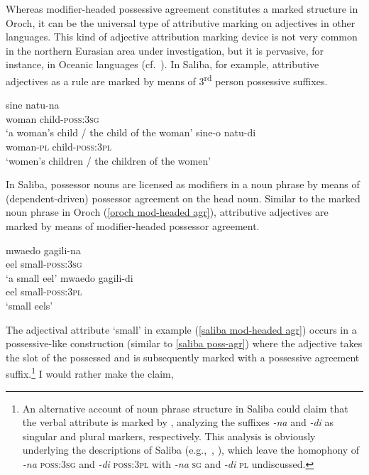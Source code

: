 Whereas modifier\hyp{}headed possessive agreement constitutes a marked structure in Oroch, it can be the universal type of attributive marking on adjectives in other languages. This kind of adjective attribution marking device is not very common in the northern Eurasian area under investigation, but it is pervasive, for instance, in Oceanic languages (cf.~\citealt{ross1998}). In Saliba, for example, attributive adjectives as a rule are marked by means of 3\textsuperscript{rd} person possessive suffixes.
\begin{exe}
\ex
{} \label{saliba poss-agr}
\begin{xlist}
\ex
\gll 	sine natu-na\\
 	woman child-\textsc{poss:3sg}\\
\glt ‘a woman's child / the child of the woman’
\ex
\gll 	sine-o natu-di\\
	woman-\textsc{pl} child-\textsc{poss:3pl}\\
\glt	‘women's children / the children of the women’%
\end{xlist}
\end{exe}
In Saliba, possessor nouns are licensed as modifiers in a noun phrase by means of (dependent\hyp{}driven) possessor agreement on the head noun. Similar to the marked noun phrase in Oroch (\ref{oroch mod-headed agr}), attributive adjectives are marked by means of modifier\hyp{}headed possessor agreement.
\begin{exe}
\ex
{} \label{saliba mod-headed agr}
\begin{xlist}
\ex
\gll 	mwaedo gagili-na\\
 eel small-\textsc{poss:3sg}\\
\glt ‘a small eel’
\ex
\gll 	mwaedo gagili-di\\
	eel small-\textsc{poss:3pl}\\
\glt ‘small eels’
\end{xlist}
\end{exe}
The adjectival attribute ‘small’ in example (\ref{saliba mod-headed agr}) occurs in a possessive-like construction (similar to \ref{saliba poss-agr}) where the adjective takes the slot of the possessed and is subsequently marked with a possessive agreement suffix.\footnote{An alternative account of noun phrase structure in Saliba could claim that the verbal attribute is marked by , analyzing the suffixes \textit{-na} and \textit{-di} as singular and plural markers, respectively. This analysis is obviously underlying the descriptions of Saliba (e.g.,~\citealt{mosel1994}, \citealt{margetts1999}), which leave the homophony of \textit{-na} \textsc{poss:3sg} and \textit{-di} \textsc{poss:3pl} with \textit{-na} \textsc{sg} and \textit{-di} \textsc{pl} undiscussed.}  I would rather make the claim, %
